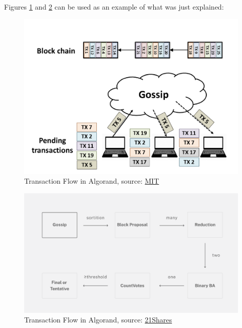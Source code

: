 Figures \ref{fig:algo} and \ref{fig:algoflow} can be used as an example of what was just explained:\newline

\begin{figure}[htbp]
	\centering
	\includegraphics[scale=0.4]{figures/algorand_workflow.png}  %
	\caption{Transaction Flow in Algorand, source: \href{https://people.csail.mit.edu/nickolai/papers/gilad-algorand-eprint.pdf}{MIT}}
	\label{fig:algo}
\end{figure}

\begin{figure}[htbp]
	\centering
	\includegraphics[scale=0.2]{figures/Algorand_primer_content_04.png}  %
	\caption{Transaction Flow in Algorand, source: \href{https://21shares.com/research/algorand-research-primer}{21Shares}}
	\label{fig:algoflow}
\end{figure}

